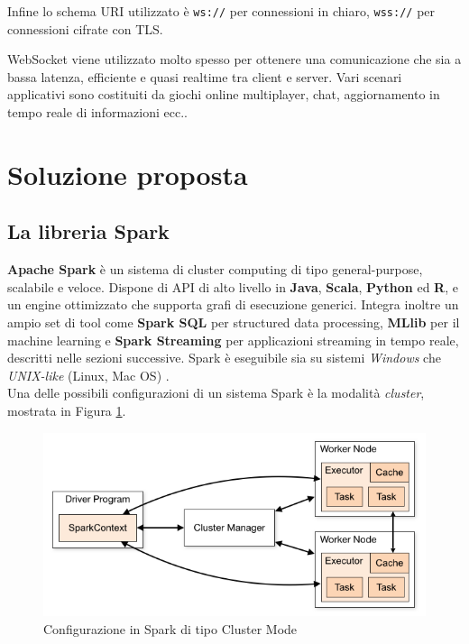 \documentclass[12pt]{article}
\begin{document}
Infine lo schema URI utilizzato è \texttt{ws://} per connessioni in chiaro, \texttt{wss://} per connessioni cifrate con TLS\cite{fette2011websocket}.

WebSocket viene utilizzato molto spesso per ottenere una comunicazione che sia a bassa latenza, efficiente e quasi realtime tra client e server. Vari scenari applicativi sono costituiti da giochi online multiplayer, chat, aggiornamento in tempo reale di informazioni ecc..

\section{Soluzione proposta}

\subsection{La libreria Spark}

\textbf{Apache Spark} è un sistema di cluster computing di tipo general-purpose, scalabile e veloce. Dispone di API di alto livello in \textbf{Java}, \textbf{Scala},\textbf{ Python} ed \textbf{R}, e un engine ottimizzato che supporta grafi di esecuzione generici. Integra inoltre un ampio set di tool come \textbf{Spark SQL} per structured data processing, \textbf{MLlib} per il machine learning e \textbf{Spark Streaming} per applicazioni streaming in tempo reale, descritti nelle sezioni successive. Spark è eseguibile sia su sistemi \textit{Windows} che \textit{UNIX-like} (Linux, Mac OS) \cite{spark}. \\

Una delle possibili configurazioni di un sistema Spark è la modalità \textit{cluster}, mostrata in Figura \ref{spark-cluster}. 

\begin{figure}[H]
	\centering
	\includegraphics[scale=0.50]{images/cluster-overview.png}
	\caption{Configurazione in Spark di tipo Cluster Mode \cite{spark}}
	\label{spark-cluster}
\end{figure}
\end{document}
